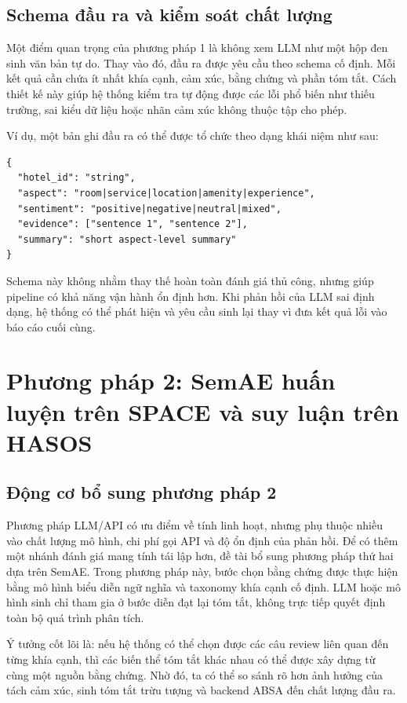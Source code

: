 \subsection{Schema đầu ra và kiểm soát chất lượng}

Một điểm quan trọng của phương pháp 1 là không xem LLM như một hộp đen sinh văn bản tự do. Thay vào đó, đầu ra được yêu cầu theo schema cố định. Mỗi kết quả cần chứa ít nhất khía cạnh, cảm xúc, bằng chứng và phần tóm tắt. Cách thiết kế này giúp hệ thống kiểm tra tự động được các lỗi phổ biến như thiếu trường, sai kiểu dữ liệu hoặc nhãn cảm xúc không thuộc tập cho phép.

Ví dụ, một bản ghi đầu ra có thể được tổ chức theo dạng khái niệm như sau:

\begin{lstlisting}[caption={Ví dụ schema đầu ra của phương pháp LLM/API}, label={lst:llm-schema}]
{
  "hotel_id": "string",
  "aspect": "room|service|location|amenity|experience",
  "sentiment": "positive|negative|neutral|mixed",
  "evidence": ["sentence 1", "sentence 2"],
  "summary": "short aspect-level summary"
}
\end{lstlisting}

Schema này không nhằm thay thế hoàn toàn đánh giá thủ công, nhưng giúp pipeline có khả năng vận hành ổn định hơn. Khi phản hồi của LLM sai định dạng, hệ thống có thể phát hiện và yêu cầu sinh lại thay vì đưa kết quả lỗi vào báo cáo cuối cùng.

\section{Phương pháp 2: SemAE huấn luyện trên SPACE và suy luận trên HASOS}

\subsection{Động cơ bổ sung phương pháp 2}

Phương pháp LLM/API có ưu điểm về tính linh hoạt, nhưng phụ thuộc nhiều vào chất lượng mô hình, chi phí gọi API và độ ổn định của phản hồi. Để có thêm một nhánh đánh giá mang tính tái lập hơn, đề tài bổ sung phương pháp thứ hai dựa trên SemAE. Trong phương pháp này, bước chọn bằng chứng được thực hiện bằng mô hình biểu diễn ngữ nghĩa và taxonomy khía cạnh cố định. LLM hoặc mô hình sinh chỉ tham gia ở bước diễn đạt lại tóm tắt, không trực tiếp quyết định toàn bộ quá trình phân tích.

Ý tưởng cốt lõi là: nếu hệ thống có thể chọn được các câu review liên quan đến từng khía cạnh, thì các biến thể tóm tắt khác nhau có thể được xây dựng từ cùng một nguồn bằng chứng. Nhờ đó, ta có thể so sánh rõ hơn ảnh hưởng của tách cảm xúc, sinh tóm tắt trừu tượng và backend ABSA đến chất lượng đầu ra.

